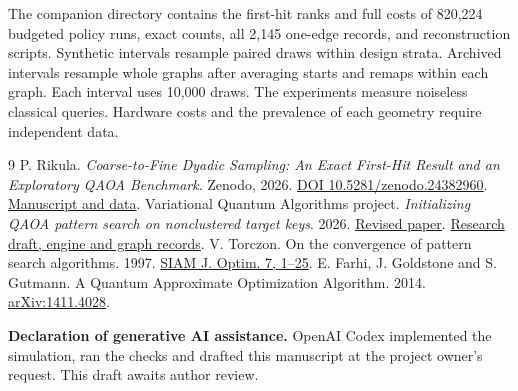 \documentclass[11pt]{article}
\newcommand{\subt}[1]{\smallskip\noindent{\sffamily\bfseries\color{teal}#1}\par}
\begin{document}
\subt{Reproduction and scope}
The companion directory contains the first-hit ranks and full costs of 820,224 budgeted policy runs, exact counts, all 2,145 one-edge records, and reconstruction scripts. Synthetic intervals resample paired draws within design strata. Archived intervals resample whole graphs after averaging starts and remaps within each graph. Each interval uses 10,000 draws. The experiments measure noiseless classical queries. Hardware costs and the prevalence of each geometry require independent data.

\begingroup\footnotesize
\renewcommand{\refname}{\sffamily\small\color{teal}References}
\begin{thebibliography}{9}\setlength{\itemsep}{0pt}\setlength{\parskip}{0pt}
 P. Rikula. \emph{Coarse-to-Fine Dyadic Sampling: An Exact First-Hit Result and an Exploratory QAOA Benchmark}. Zenodo, 2026. \href{https://doi.org/10.5281/zenodo.24382960}{DOI 10.5281/zenodo.24382960}. \href{https://github.com/kummahiih/variational-quantum-algorithms/tree/0ab4abc6ea3a980cd86ac77447979b5e469b54d5/paper}{Manuscript and data}.
 Variational Quantum Algorithms project. \emph{Initializing QAOA pattern search on nonclustered target keys}. 2026. \href{https://github.com/kummahiih/variational-quantum-algorithms/blob/main/paper/hybrid/hybrid_qaoa.pdf}{Revised paper}. \href{https://github.com/kummahiih/variational-quantum-algorithms/tree/8b066ec58925dd05dda6712aa5943c4f8b4d4487/paper/hybrid}{Research draft, engine and graph records}.
 V. Torczon. On the convergence of pattern search algorithms. 1997. \href{https://doi.org/10.1137/S1052623493250780}{SIAM J. Optim. 7, 1--25}.
 E. Farhi, J. Goldstone and S. Gutmann. A Quantum Approximate Optimization Algorithm. 2014. \href{https://arxiv.org/abs/1411.4028}{arXiv:1411.4028}.
\end{thebibliography}
\endgroup
{\footnotesize\textbf{Declaration of generative AI assistance.} OpenAI Codex implemented the simulation, ran the checks and drafted this manuscript at the project owner's request. This draft awaits author review.\par}
\end{document}
